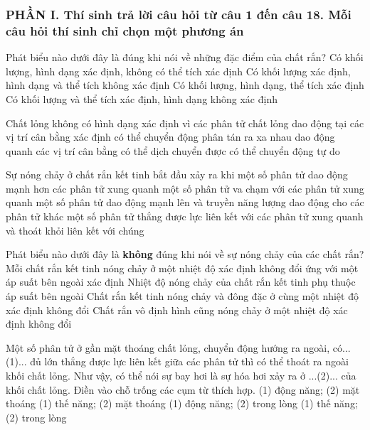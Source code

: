 \subsubsection*{PHẦN I. Thí sinh trả lời câu hỏi từ câu 1 đến câu 18. Mỗi câu hỏi thí sinh chỉ chọn một phương án}
\setcounter{ex}{0}
\begin{ex}%
	Phát biểu nào dưới đây là đúng khi nói về những đặc điểm của chất rắn?
	\choice
	{Có khối lượng, hình dạng xác định, không có thể tích xác định}
	{Có khối lượng xác định, hình dạng và thể tích không xác định}
	{\True Có khối lượng, hình dạng, thể tích xác định}
	{Có khối lượng và thể tích xác định, hình dạng không xác định}
	\loigiai{
		
	}
\end{ex}

\begin{ex}%
	Chất lỏng không có hình dạng xác định vì các phân tử chất lỏng
	\choice
	{dao động tại các vị trí cân bằng xác định}
	{có thể chuyển động phân tán ra xa nhau}
	{\True dao động quanh các vị trí cân bằng có thể dịch chuyển được}
	{có thể chuyển động tự do}
	\loigiai{
		
	}
\end{ex}

\begin{ex}%
	Sự nóng chảy ở chất rắn kết tinh bắt đầu xảy ra khi
	\choice
	{một số phân tử dao động mạnh hơn các phân tử xung quanh}
	{một số phân tử va chạm với các phân tử xung quanh}
	{một số phân tử dao động mạnh lên và truyền năng lượng dao động cho các phân tử khác}
	{\True một số phân tử thắng được lực liên kết với các phân tử xung quanh và thoát khỏi liên kết với chúng}
	\loigiai{
		
	}
\end{ex}

\begin{ex}%
	Phát biểu nào dưới đây là \textbf{không} đúng khi nói về sự nóng chảy của các chất rắn?
	\choice
	{Mỗi chất rắn kết tinh nóng chảy ở một nhiệt độ xác định không đổi ứng với một áp suất bên ngoài xác định}
	{Nhiệt độ nóng chảy của chất rắn kết tinh phụ thuộc áp suất bên ngoài}
	{Chất rắn kết tinh nóng chảy và đông đặc ở cùng một nhiệt độ xác định không đổi}
	{\True Chất rắn vô định hình cũng nóng chảy ở một nhiệt độ xác định không đổi}
	\loigiai{
		
	}
\end{ex}

\begin{ex}%
	Một số phân tử ở gần mặt thoáng chất lỏng, chuyển động hướng ra ngoài, có...(1)... đủ lớn thắng được lực liên kết giữa các phân tử thì có thể thoát ra ngoài khối chất lỏng. Như vậy, có thể nói sự bay hơi là sự hóa hơi xảy ra ở ...(2)... của khối chất lỏng. Điền vào chỗ trống các cụm từ thích hợp.
	\choice
	{\True (1) động năng; (2) mặt thoáng}
	{(1) thế năng; (2) mặt thoáng}
	{(1) động năng; (2) trong lòng}
	{(1) thế năng; (2) trong lòng}
	\loigiai{
		
	}
\end{ex}

